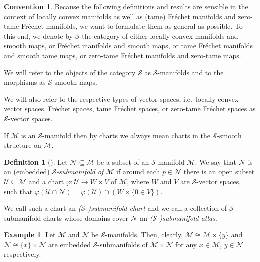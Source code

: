 \documentclass[12pt,a4paper]{article}
\theoremstyle{plain}
\theoremstyle{definition}
\newtheorem{definition}[theorem]{Definition}
\newtheorem{example}[theorem]{Example}
\newtheorem{convention}[theorem]{Convention}
\newcommand{\Mcal}{\mathcal{M}}
\newcommand{\Ncal}{\mathcal{N}}
\newcommand{\Scal}{\mathcal{S}}
\newcommand{\Ucal}{\mathcal{U}}
\begin{document}
\begin{convention}
\label{Conv:ScalManifolds}
Because the following definitions and results are sensible in the context of locally convex manifolds as well as (tame) Fréchet manifolds and zero-tame Fréchet manifolds, we want to formulate them as general as possible. To this end, we denote by $\Scal$ the category of either locally convex manifolds and smooth maps, or Fréchet manifolds and smooth maps, or tame Fréchet manifolds and smooth tame maps, or zero-tame Fréchet manifolds and zero-tame maps.

We will refer to the objects of the category $\Scal$ as $\Scal$-manifolds and to the morphisms as $\Scal$-smooth maps.

We will also refer to the respective types of vector spaces, i.e.~locally convex vector spaces, Fréchet spaces, tame Fréchet spaces, or zero-tame Fréchet spaces as $\Scal$-vector spaces.

If $\Mcal$ is an $\Scal$-manifold then by charts we always mean charts in the $\Scal$-smooth structure on $\Mcal$.
\end{convention}


\begin{definition}[{\cite[Part I, Definition 4.2.1]{hamilton}}]
Let $\Ncal \subseteq \Mcal$ be a subset of an $\Scal$-manifold $\Mcal$. We say that $\Ncal$ is an (embedded) \textit{$\Scal$-submanifold of $\Mcal$} if around each $p\in \Ncal$ there is an open subset $\Ucal\subseteq \Mcal$ and a chart $\varphi:\Ucal \to W\times V$ of $\Mcal$, where $W$ and $V$ are $\Scal$-vector spaces, such that $\varphi(\Ucal\cap \Ncal)=\varphi(\Ucal)\cap (W\times \{0\in V\})$.

We call such a chart an \textit{($\Scal$-)submanifold chart} and we call a collection of $\Scal$-submanifold charts whose domains cover $\Ncal$ an \textit{($\Scal$-)submanifold atlas}. 
\end{definition}

\begin{example}
Let $\Mcal$ and $\Ncal$ be $\Scal$-manifolds. Then, clearly, $\Mcal\cong \Mcal\times \{y\}$ and $\Ncal\cong \{x\}\times \Ncal$ are embedded $\Scal$-submanifolds of $\Mcal \times\Ncal$ for any $x \in \Mcal$, $y\in \Ncal$ respectively.
\end{example}
\end{document}
